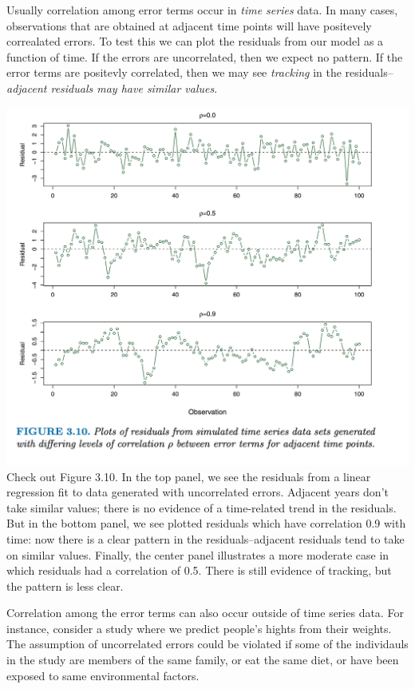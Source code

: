 \documentclass[
  letterpaper,
  DIV=11,
  numbers=noendperiod]{scrreprt}
\begin{document}
Usually correlation among error terms occur in \emph{time series} data.
In many cases, observations that are obtained at adjacent time points
will have positevely correalated errors. To test this we can plot the
residuals from our model as a function of time. If the errors are
uncorrelated, then we expect no pattern. If the error terms are
positevly correlated, then we may see \emph{tracking} in the
residuals--\emph{adjacent residuals may have similar values}.

\includegraphics{fig3.10.png} Check out Figure 3.10. In the top panel,
we see the residuals from a linear regression fit to data generated with
uncorrelated errors. Adjacent years don't take similar values; there is
no evidence of a time-related trend in the residuals. But in the bottom
panel, we see plotted residuals which have correlation 0.9 with time:
now there is a clear pattern in the residuals--adjacent residuals tend
to take on similar values. Finally, the center panel illustrates a more
moderate case in which residuals had a correlation of 0.5. There is
still evidence of tracking, but the pattern is less clear.

Correlation among the error terms can also occur outside of time series
data. For instance, consider a study where we predict people's hights
from their weights. The assumption of uncorrelated errors could be
violated if some of the individauls in the study are members of the same
family, or eat the same diet, or have been exposed to same environmental
factors.
\end{document}

